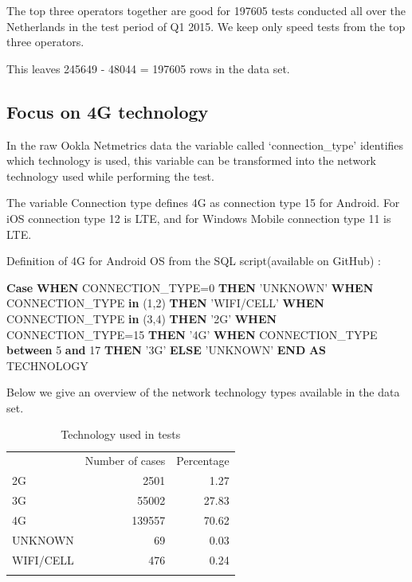 \documentclass[]{article}
\newenvironment{Shaded}{\begin{snugshade}}{\end{snugshade}}
\newcommand{\KeywordTok}[1]{\textcolor[rgb]{0.13,0.29,0.53}{\textbf{{#1}}}}
\newcommand{\DecValTok}[1]{\textcolor[rgb]{0.00,0.00,0.81}{{#1}}}
\newcommand{\StringTok}[1]{\textcolor[rgb]{0.31,0.60,0.02}{{#1}}}
\newcommand{\NormalTok}[1]{{#1}}
\begin{document}
The top three operators together are good for 197605 tests conducted all
over the Netherlands in the test period of Q1 2015. We keep only speed
tests from the top three operators.

This leaves 245649 - 48044 = 197605 rows in the data set.

\subsection{Focus on 4G technology}\label{focus-on-4g-technology}

In the raw Ookla Netmetrics data the variable called `connection\_type'
identifies which technology is used, this variable can be transformed
into the network technology used while performing the test.

The variable Connection type defines 4G as connection type 15 for
Android. For iOS connection type 12 is LTE, and for Windows Mobile
connection type 11 is LTE.

Definition of 4G for Android OS from the SQL script(available on GitHub)
:

\begin{Shaded}
\begin{Highlighting}[]
  \KeywordTok{Case}  \KeywordTok{WHEN}  \NormalTok{CONNECTION_TYPE=}\DecValTok{0}         \KeywordTok{THEN} \StringTok{'UNKNOWN'}
    \KeywordTok{WHEN}    \NormalTok{CONNECTION_TYPE }\KeywordTok{in} \NormalTok{(}\DecValTok{1}\NormalTok{,}\DecValTok{2}\NormalTok{)        }\KeywordTok{THEN} \StringTok{'WIFI/CELL'}
    \KeywordTok{WHEN}    \NormalTok{CONNECTION_TYPE }\KeywordTok{in} \NormalTok{(}\DecValTok{3}\NormalTok{,}\DecValTok{4}\NormalTok{)        }\KeywordTok{THEN} \StringTok{'2G'}
    \KeywordTok{WHEN}    \NormalTok{CONNECTION_TYPE=}\DecValTok{15}          \KeywordTok{THEN} \StringTok{'4G'}
    \KeywordTok{WHEN}    \NormalTok{CONNECTION_TYPE }\KeywordTok{between} \DecValTok{5} \KeywordTok{and} \DecValTok{17}    \KeywordTok{THEN} \StringTok{'3G'}
    \KeywordTok{ELSE}    \StringTok{'UNKNOWN'}
  \KeywordTok{END} \KeywordTok{AS} \NormalTok{TECHNOLOGY}
\end{Highlighting}
\end{Shaded}

Below we give an overview of the network technology types available in
the data set.

\begin{longtable}[c]{@{}lrr@{}}
\toprule\addlinespace
& Number of cases & Percentage
\\\addlinespace
\midrule\endhead
2G & 2501 & 1.27
\\\addlinespace
3G & 55002 & 27.83
\\\addlinespace
4G & 139557 & 70.62
\\\addlinespace
UNKNOWN & 69 & 0.03
\\\addlinespace
WIFI/CELL & 476 & 0.24
\\\addlinespace
\bottomrule
\addlinespace
\caption{Technology used in tests}
\end{longtable}
\end{document}
